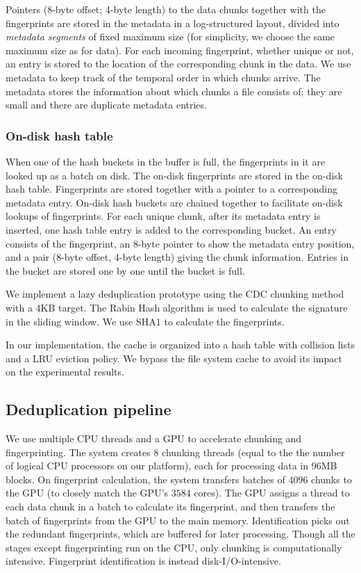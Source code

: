 \documentclass[prodmode,acmtecs]{acmsmall}
\begin{document}
Pointers (8-byte offset; 4-byte length) to the data chunks together with the fingerprints are stored in the metadata in a log-structured layout, divided into \emph{metadata segments} of fixed maximum size (for simplicity, we choose the same maximum size as for data).  For each incoming fingerprint, whether unique or not, an entry is stored to the location of the corresponding chunk in the data.  We use metadata to keep track of the temporal order in which chunks arrive. The metadata stores the information about which chunks a file consists of; they are small and there are duplicate metadata entries.

\subsubsection{On-disk hash table}

When one of the hash buckets in the buffer is full, the fingerprints in it are looked up as a batch on disk. The on-disk fingerprints are stored in the on-disk hash table.  Fingerprints are stored together with a pointer to a corresponding metadata entry.  On-disk hash buckets are chained together to facilitate on-disk lookups of fingerprints. For each unique chunk, after its metadata entry is inserted, one hash table entry is added to the corresponding bucket. An entry consists of the fingerprint, an 8-byte pointer to show the metadata entry position, and a pair (8-byte offset, 4-byte length) giving the chunk information. Entries in the bucket are stored one by one until the bucket is full.

We implement a lazy deduplication prototype using the CDC chunking method~\cite{policroniades2004alternatives} with a $4$KB target. The Rabin Hash algorithm is used to calculate the signature in the sliding window. We use SHA1 to calculate the fingerprints.


In our implementation, the cache is organized into a hash table with collision lists and a LRU eviction policy.  We bypass the file system cache to avoid its impact on the experimental results.


\subsection{Deduplication pipeline}

We use multiple CPU threads and a GPU to accelerate chunking and fingerprinting. The system creates $8$ chunking threads (equal to the the number of logical CPU processors on our platform), each for processing data in $96$MB blocks. On fingerprint calculation, the system transfers batches of $4096$ chunks to the GPU (to closely match the GPU's $3584$ cores). The GPU assigns a thread to each data chunk in a batch to calculate its fingerprint, and then transfers the batch of fingerprints from the GPU to the main memory.  Identification picks out the redundant fingerprints, which are buffered for later processing. Though all the stages except fingerprinting run on the CPU, only chunking is computationally intensive. Fingerprint identification is instead disk-I/O-intensive.
\end{document}
